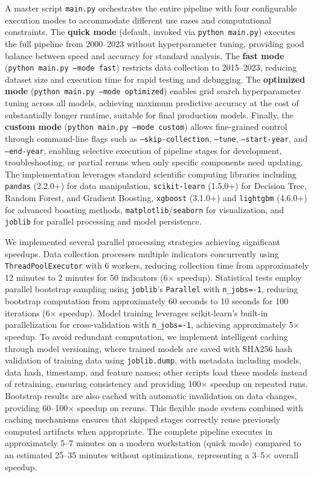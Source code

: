 \documentclass[10pt,twocolumn]{article}
\begin{document}
\par A master script \texttt{main.py} orchestrates the entire pipeline with four configurable execution modes to accommodate different use cases and computational constraints. The \textbf{quick mode} (default, invoked via \texttt{python main.py}) executes the full pipeline from 2000--2023 without hyperparameter tuning, providing good balance between speed and accuracy for standard analysis. The \textbf{fast mode} (\texttt{python main.py --mode fast}) restricts data collection to 2015--2023, reducing dataset size and execution time for rapid testing and debugging. The \textbf{optimized mode} (\texttt{python main.py --mode optimized}) enables grid search hyperparameter tuning across all models, achieving maximum predictive accuracy at the cost of substantially longer runtime, suitable for final production models. Finally, the \textbf{custom mode} (\texttt{python main.py --mode custom}) allows fine-grained control through command-line flags such as \texttt{--skip-collection}, \texttt{--tune}, \texttt{--start-year}, and \texttt{--end-year}, enabling selective execution of pipeline stages for development, troubleshooting, or partial reruns when only specific components need updating. The implementation leverages standard scientific computing libraries including \texttt{pandas} (2.2.0+) for data manipulation, \texttt{scikit-learn} (1.5.0+) for Decision Tree, Random Forest, and Gradient Boosting, \texttt{xgboost} (3.1.0+) and \texttt{lightgbm} (4.6.0+) for advanced boosting methods, \texttt{matplotlib}/\texttt{seaborn} for visualization, and \texttt{joblib} for parallel processing and model persistence.
\par We implemented several parallel processing strategies achieving significant speedups. Data collection processes multiple indicators concurrently using \texttt{ThreadPoolExecutor} with 6 workers, reducing collection time from approximately 12 minutes to 2 minutes for 50 indicators (6$\times$ speedup). Statistical tests employ parallel bootstrap sampling using \texttt{joblib}'s \texttt{Parallel} with \texttt{n\_jobs=-1}, reducing bootstrap computation from approximately 60 seconds to 10 seconds for 100 iterations (6$\times$ speedup). Model training leverages scikit-learn's built-in parallelization for cross-validation with \texttt{n\_jobs=-1}, achieving approximately 5$\times$ speedup. To avoid redundant computation, we implement intelligent caching through model versioning, where trained models are saved with SHA256 hash validation of training data using \texttt{joblib.dump}, with metadata including models, data hash, timestamp, and feature names; other scripts load these models instead of retraining, ensuring consistency and providing 100$\times$ speedup on repeated runs. Bootstrap results are also cached with automatic invalidation on data changes, providing 60--100$\times$ speedup on reruns. This flexible mode system combined with caching mechanisms ensures that skipped stages correctly reuse previously computed artifacts when appropriate. The complete pipeline executes in approximately 5--7 minutes on a modern workstation (quick mode) compared to an estimated 25--35 minutes without optimizations, representing a 3--5$\times$ overall speedup.
\end{document}
